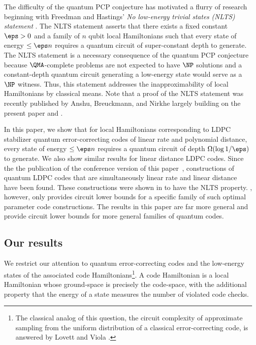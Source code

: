 \documentclass[11pt]{article}
\begin{document}
The difficulty of the quantum PCP conjecture has motivated a flurry of research beginning with Freedman and Hastings' \emph{No low-energy trivial states (NLTS) statement} \cite{10.5555/2600498.2600507}. The NLTS statement asserts that there exists a fixed constant $\eps > 0$ and a family of $n$ qubit local Hamiltonians such that every state of energy $\leq \eps n$ requires a quantum circuit of super-constant depth to generate. The NLTS statement is a necessary consequence of the quantum PCP conjecture because $\QMA$-complete problems are not expected to have $\NP$ solutions and a constant-depth quantum circuit generating a low-energy state would serve as a $\NP$ witness. Thus, this statement addresses the inapproximability of local Hamiltonians by classical means. Note that a proof of the NLTS statement was recently published by Anshu, Breuckmann, and Nirkhe \cite{nlts-proof} largely building %
on %
the present paper and \cite{cnlts-proof}.

In this %
paper,   %
we show that for local Hamiltonians corresponding to LDPC stabilizer quantum error-correcting codes of linear rate and polynomial distance, every state of energy $\leq \eps n$ requires a quantum circuit of depth $\Omega(\log 1/\eps)$ to generate. We also show similar results for linear distance LDPC codes. Since the %
the publication of the conference version of this paper~\cite{conf-version},
%
constructions of quantum LDPC codes that are simultaneously linear rate and linear distance have been %
found.  %
These constructions were shown in \cite{nlts-proof} to have the NLTS property. \cite{nlts-proof}, however, only provides circuit lower bounds for a specific family of such optimal parameter code constructions. The results in this %
paper  %
are far more general and provide circuit lower bounds for more general families of quantum codes.


\subsection{Our results}


We restrict our attention to quantum error-correcting codes and the low-energy states of the associated code Hamiltonians\footnote{The classical analog of this question, the circuit complexity of approximate sampling from the uniform distribution of a classical error-correcting code, is answered by Lovett and Viola \cite{lovett-viola}.}. A code Hamiltonian is a local Hamiltonian whose ground-space is precisely the code-space, with the additional property that the energy of a state measures the number of violated code checks. 
\end{document}
